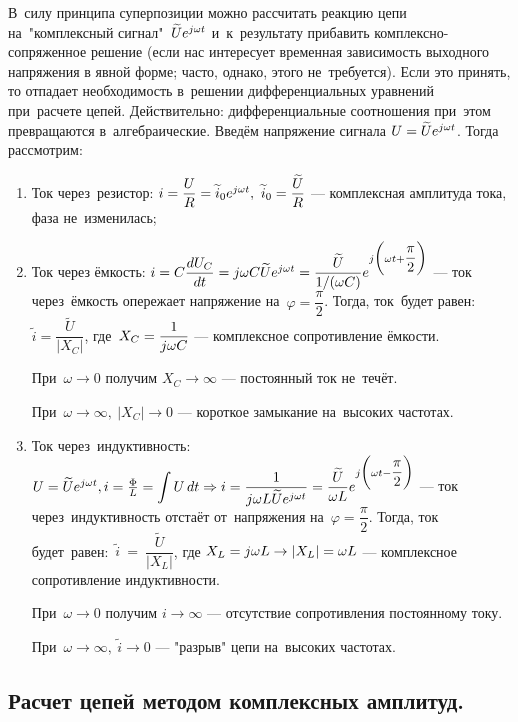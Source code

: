 \documentclass[../main/main.tex]{subfiles}
\begin{document}
В~силу принципа суперпозиции можно рассчитать реакцию цепи на~"комплексный сигнал"{}~$\widetilde{U} e^{j\omega t}$ и~к~результату прибавить комплексно-сопряженное решение (если нас интересует временная зависимость выходного напряжения в явной форме; часто, однако, этого не~требуется). Если это принять, то отпадает необходимость в~решении дифференциальных уравнений при~расчете цепей. Действительно: дифференциальные соотношения при~этом превращаются в~алгебраические. Введём напряжение сигнала $U = \widetilde{U} e^{j\omega t}$. Тогда рассмотрим: 
\begin{enumerate}
\item Ток через~резистор: $i = \dfrac{U}{R} = \widetilde{i}_0 e^{j\omega t},~\widetilde{i}_0 = \dfrac{\widetilde{U}}{R}$ --- комплексная амплитуда тока, фаза не~изменилась;

\item Ток через ёмкость: $i = C \dfrac{dU_C}{dt} = j\omega C \widetilde{U} e^{j\omega t} = \dfrac{\widetilde{U}}{1/(\omega C)} e^{j\bigg(\omega t + \dfrac{\pi}{2}\bigg)}$ --- ток через~ёмкость опережает напряжение на~$\varphi = \dfrac{\pi}{2}$. Тогда, ток~будет равен:~$\widetilde{i} = \dfrac{\widetilde{U}}{|X_C|}$, где~$X_C = \dfrac{1}{j\omega C}$ --- комплексное сопротивление ёмкости. 

При~$\omega \rightarrow 0$ получим $X_C \rightarrow \infty$ --- постоянный ток не~течёт. 

При~$\omega \rightarrow \infty,~|X_C| \rightarrow 0$ --- короткое замыкание на~высоких частотах.

\item Ток через~индуктивность: $U = \widetilde{U} e^{j\omega t}, i = \frac{\Phi}{L} = \displaystyle \int U \, dt \Rightarrow i = \dfrac{1}{j\omega L \widetilde{U} e^{j\omega t}} = \dfrac{\widetilde{U}}{\omega L} e^{j\bigg(\omega t - \dfrac{\pi}{2}\bigg)}$ --- ток через~индуктивность отстаёт от~напряжения на~$\varphi = \dfrac{\pi}{2}$. Тогда, ток будет~равен:~$\widetilde{i}~=~\dfrac{\widetilde{U}}{|X_L|}$, где $X_L = j\omega L \rightarrow |X_L| = \omega L$ --- комплексное сопротивление индуктивности.

При~$\omega \rightarrow 0$ получим $i \rightarrow \infty$ --- отсутствие сопротивления постоянному току. 

При~$\omega \rightarrow \infty,~\widetilde{i} \rightarrow 0$ --- "разрыв"{} цепи на~высоких частотах.

\end{enumerate}

\subsection{Расчет цепей методом комплексных амплитуд.}
\end{document}
